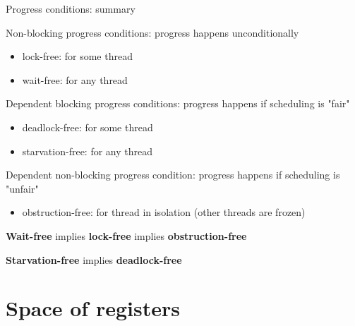 \begin{frame}{Progress conditions: summary}

Non-blocking progress conditions: progress happens unconditionally
\begin{itemize}
  \item lock-free: for some thread
  \item wait-free: for any thread
\end{itemize}

Dependent blocking progress conditions: progress happens if scheduling is "fair"
\begin{itemize}
  \item deadlock-free: for some thread
  \item starvation-free: for any thread
\end{itemize}

Dependent non-blocking progress condition: progress happens if scheduling is "unfair"
\begin{itemize}
  \item obstruction-free: for thread in isolation (other threads are frozen)
\end{itemize}

\pause

\begin{theorem}
\textbf{Wait-free} implies \textbf{lock-free} implies \textbf{obstruction-free}

\textbf{Starvation-free} implies \textbf{deadlock-free}
\end{theorem}

\end{frame}


\section{Space of registers}
\showTOC


